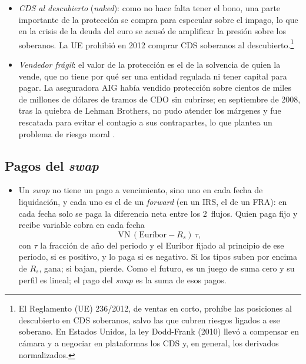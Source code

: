 \documentclass[11pt]{article}
\begin{document}
\begin{itemize}
  \begin{itemize}
  \item \emph{CDS al descubierto} (\emph{naked}): como no hace falta tener el bono, una parte importante de la protección se compra para especular sobre el impago, lo que en la crisis de la deuda del euro se acusó de amplificar la presión sobre los soberanos. La UE prohibió en 2012 comprar CDS soberanos al descubierto\nocite{UE2012VentasCorto}.\footnote{El Reglamento (UE) 236/2012, de ventas en corto, prohíbe las posiciones al descubierto en CDS soberanos, salvo las que cubren riesgos ligados a ese soberano. En Estados Unidos, la ley Dodd-Frank (2010)\nocite{DoddFrank2010} llevó a compensar en cámara y a negociar en plataformas los CDS y, en general, los derivados normalizados.}
  \item \emph{Vendedor frágil}: el valor de la protección es el de la solvencia de quien la vende, que no tiene por qué ser una entidad regulada ni tener capital para pagar. La aseguradora AIG había vendido protección sobre cientos de miles de millones de dólares de tramos de CDO sin cubrirse; en septiembre de 2008, tras la quiebra de Lehman Brothers, no pudo atender los márgenes y fue rescatada para evitar el contagio a sus contrapartes, lo que plantea un problema de riesgo moral\nocite{Bernanke2010Causes,Stulz2010Credit} .
  \end{itemize}
\end{itemize}

\subsection{Pagos del \emph{swap}}\label{sec:pagos-swaps}

\begin{itemize}
\item Un \emph{swap} no tiene un pago a vencimiento, sino uno en cada fecha de liquidación, y cada uno es el de un \emph{forward} (en un IRS, el de un FRA): en cada fecha solo se paga la diferencia neta entre los 2~flujos. Quien paga fijo y recibe variable cobra en cada fecha
  \begin{equation}\label{eq:pago-swap}
  \mathrm{VN}\,(\text{Euríbor}-R_s)\,\tau,
  \end{equation}
  con $\tau$ la fracción de año del periodo y el Euríbor fijado al principio de ese periodo, si es positivo, y lo paga si es negativo. Si los tipos suben por encima de $R_s$, gana; si bajan, pierde. Como el futuro, es un juego de suma cero y su perfil es lineal; el pago del \emph{swap} es la suma de esos pagos.
\end{itemize}
\end{document}
